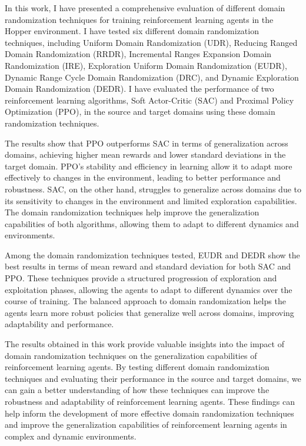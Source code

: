 \documentclass[12pt]{article}
\begin{document}
In this work, I have presented a comprehensive evaluation of different domain randomization techniques for training reinforcement learning agents in the Hopper environment. I have tested six different domain randomization techniques, including Uniform Domain Randomization (UDR), Reducing Ranged Domain Randomization (RRDR), Incremental Ranges Expansion Domain Randomization (IRE), Exploration Uniform Domain Randomization (EUDR), Dynamic Range Cycle Domain Randomization (DRC), and Dynamic Exploration Domain Randomization (DEDR). I have evaluated the performance of two reinforcement learning algorithms, Soft Actor-Critic (SAC) and Proximal Policy Optimization (PPO), in the source and target domains using these domain randomization techniques.

The results show that PPO outperforms SAC in terms of generalization across domains, achieving higher mean rewards and lower standard deviations in the target domain. PPO's stability and efficiency in learning allow it to adapt more effectively to changes in the environment, leading to better performance and robustness. SAC, on the other hand, struggles to generalize across domains due to its sensitivity to changes in the environment and limited exploration capabilities. The domain randomization techniques help improve the generalization capabilities of both algorithms, allowing them to adapt to different dynamics and environments.

Among the domain randomization techniques tested, EUDR and DEDR show the best results in terms of mean reward and standard deviation for both SAC and PPO. These techniques provide a structured progression of exploration and exploitation phases, allowing the agents to adapt to different dynamics over the course of training. The balanced approach to domain randomization helps the agents learn more robust policies that generalize well across domains, improving adaptability and performance.

The results obtained in this work provide valuable insights into the impact of domain randomization techniques on the generalization capabilities of reinforcement learning agents. By testing different domain randomization techniques and evaluating their performance in the source and target domains, we can gain a better understanding of how these techniques can improve the robustness and adaptability of reinforcement learning agents. These findings can help inform the development of more effective domain randomization techniques and improve the generalization capabilities of reinforcement learning agents in complex and dynamic environments.
\end{document}
